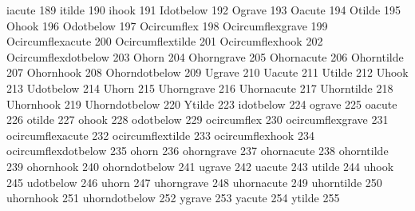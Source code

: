  iacute              189
 itilde              190
 ihook               191
 Idotbelow           192
 Ograve              193
 Oacute              194
 Otilde              195
 Ohook               196
 Odotbelow           197
 Ocircumflex         198
 Ocircumflexgrave    199
 Ocircumflexacute    200
 Ocircumflextilde    201
 Ocircumflexhook     202
 Ocircumflexdotbelow 203
 Ohorn               204
 Ohorngrave          205
 Ohornacute          206
 Ohorntilde          207
 Ohornhook           208
 Ohorndotbelow       209
 Ugrave              210
 Uacute              211
 Utilde              212
 Uhook               213
 Udotbelow           214
 Uhorn               215
 Uhorngrave          216
 Uhornacute          217
 Uhorntilde          218
 Uhornhook           219
 Uhorndotbelow       220
 Ytilde              223
 idotbelow           224
 ograve              225
 oacute              226
 otilde              227
 ohook               228
 odotbelow           229
 ocircumflex         230
 ocircumflexgrave    231
 ocircumflexacute    232
 ocircumflextilde    233
 ocircumflexhook     234
 ocircumflexdotbelow 235
 ohorn               236
 ohorngrave          237
 ohornacute          238
 ohorntilde          239
 ohornhook           240
 ohorndotbelow       241
 ugrave              242
 uacute              243
 utilde              244
 uhook               245
 udotbelow           246
 uhorn               247
 uhorngrave          248
 uhornacute          249
 uhorntilde          250
 uhornhook           251
 uhorndotbelow       252
 ygrave              253
 yacute              254
 ytilde              255

